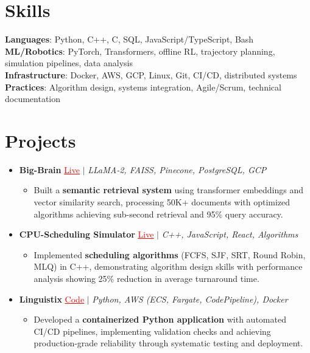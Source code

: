 \documentclass[letterpaper,10pt]{article}
\newcommand{\resumeItem}[1]{\item\small{{#1 \vspace{-2pt}}}}
\newcommand{\resumeProjectHeading}[1]{\item \small #1 \vspace{-2pt}}
\newcommand{\resumeSubHeadingListStart}{\begin{itemize}[leftmargin=0.0in, label={}]}
\newcommand{\resumeSubHeadingListEnd}{\end{itemize}}
\newcommand{\resumeProjItemListStart}{\begin{itemize}[leftmargin=0.15in,label=\textbullet,itemsep=0pt,topsep=0pt,parsep=0pt,partopsep=0pt]}
\newcommand{\resumeProjItemListEnd}{\end{itemize}\vspace{-4pt}}
\begin{document}
\section{Skills}
\begin{itemize}[leftmargin=0.15in, label={}]
\small{\item{
\textbf{Languages}: Python, C++, C, SQL, JavaScript/TypeScript, Bash \\
\textbf{ML/Robotics}: PyTorch, Transformers, offline RL, trajectory planning, simulation pipelines, data analysis \\
\textbf{Infrastructure}: Docker, AWS, GCP, Linux, Git, CI/CD, distributed systems \\
\textbf{Practices}: Algorithm design, systems integration, Agile/Scrum, technical documentation
}}
\end{itemize}
\vspace{-16pt}
\section{Projects}
\resumeSubHeadingListStart
\vspace{-2pt}
\resumeProjectHeading{\textbf{Big-Brain} {\href{https://big-brain-pied.vercel.app/}{\textcolor{red}{\underline{Live}}}} $|$ \emph{LLaMA-2, FAISS, Pinecone, PostgreSQL, GCP}}
\resumeProjItemListStart
\resumeItem{Built a \textbf{semantic retrieval system} using transformer embeddings and vector similarity search, processing 50K+ documents with optimized algorithms achieving sub-second retrieval and 95\% query accuracy.}
\resumeProjItemListEnd
\vspace{3pt}
\resumeProjectHeading{\textbf{CPU-Scheduling Simulator} {\href{https://cpu-scheduler-amber.vercel.app/}{\textcolor{red}{\underline{Live}}}} $|$ \emph{C++, JavaScript, React, Algorithms}}
\resumeProjItemListStart
\resumeItem{Implemented \textbf{scheduling algorithms} (FCFS, SJF, SRT, Round Robin, MLQ) in C++, demonstrating algorithm design skills with performance analysis showing 25\% reduction in average turnaround time.}
\resumeProjItemListEnd
\vspace{3pt}
\resumeProjectHeading{\textbf{Linguistix} {\href{https://github.com/SAHAJ-BHADJA/Linguistix}{\textcolor{red}{\underline{Code}}}} $|$ \emph{Python, AWS (ECS, Fargate, CodePipeline), Docker}}
\resumeProjItemListStart
\resumeItem{Developed a \textbf{containerized Python application} with automated CI/CD pipelines, implementing validation checks and achieving production-grade reliability through systematic testing and deployment.}
\resumeProjItemListEnd
\resumeSubHeadingListEnd
\end{document}
